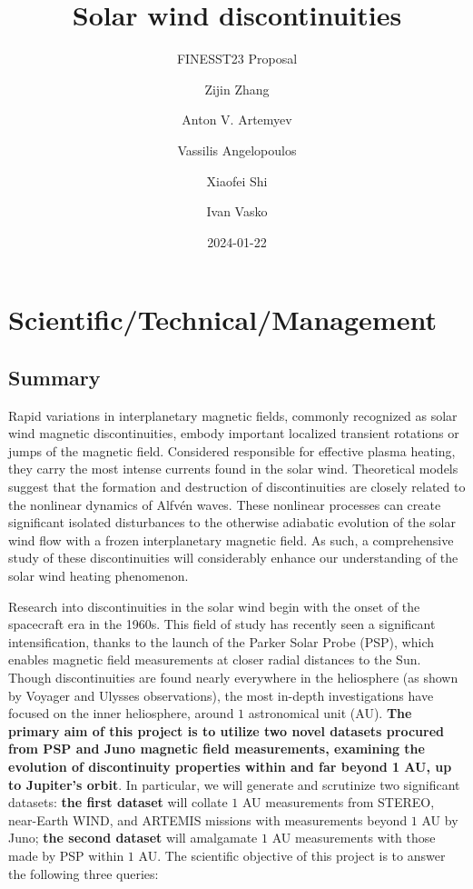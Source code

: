 \documentclass[
  letterpaper,
  DIV=11,
  numbers=noendperiod]{scrartcl}
\title{Solar wind discontinuities}
\subtitle{FINESST23 Proposal}
\author{Zijin Zhang \and Anton V. Artemyev \and Vassilis
Angelopoulos \and Xiaofei Shi \and Ivan Vasko}
\date{2024-01-22}
\begin{document}
\maketitle

\section{Scientific/Technical/Management}\label{scientifictechnicalmanagement}

\subsection{Summary}\label{summary}

Rapid variations in interplanetary magnetic fields, commonly recognized
as solar wind magnetic discontinuities, embody important localized
transient rotations or jumps of the magnetic field. Considered
responsible for effective plasma heating, they carry the most intense
currents found in the solar wind. Theoretical models suggest that the
formation and destruction of discontinuities are closely related to the
nonlinear dynamics of Alfvén waves. These nonlinear processes can create
significant isolated disturbances to the otherwise adiabatic evolution
of the solar wind flow with a frozen interplanetary magnetic field. As
such, a comprehensive study of these discontinuities will considerably
enhance our understanding of the solar wind heating phenomenon.

Research into discontinuities in the solar wind begin with the onset of
the spacecraft era in the 1960s. This field of study has recently seen a
significant intensification, thanks to the launch of the Parker Solar
Probe (PSP), which enables magnetic field measurements at closer radial
distances to the Sun. Though discontinuities are found nearly everywhere
in the heliosphere (as shown by Voyager and Ulysses observations), the
most in-depth investigations have focused on the inner heliosphere,
around \(1\) astronomical unit (AU). \textbf{The primary aim of this
project is to utilize two novel datasets procured from PSP and Juno
magnetic field measurements, examining the evolution of discontinuity
properties within and far beyond 1 AU, up to Jupiter's orbit}. In
particular, we will generate and scrutinize two significant datasets:
\textbf{the first dataset} will collate \(1\) AU measurements from
STEREO, near-Earth WIND, and ARTEMIS missions with measurements beyond
\(1\) AU by Juno; \textbf{the second dataset} will amalgamate \(1\) AU
measurements with those made by PSP within \(1\) AU. The scientific
objective of this project is to answer the following three queries:
\end{document}
